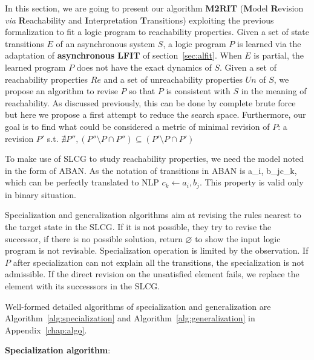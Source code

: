     In this section, we are going to present our algorithm \textbf{M2RIT} (\textbf{M}odel \textbf{R}evision \textit{via} \textbf{R}eachability and \textbf{I}nterpretation \textbf{T}ransitions) exploiting the previous formalization to fit a logic program to reachability properties.
    Given a set of state transitions $E$ of an asynchronous system $S$, a logic program $P$ is learned via the adaptation of \textbf{asynchronous LFIT} of section~\ref{sec:alfit}.
    When $E$ is partial, the learned program $P$ does not have the exact dynamics of $S$.
    Given a set of reachability properties $Re$ and a set of unreachability properties $Un$ of $S$, we propose an algorithm to revise $P$ so that $P$ is consistent with $S$ in the meaning of reachability.
    As discussed previously, this can be done by complete brute force but here we propose a first attempt to reduce the search space.
    Furthermore, our goal is to find what could be considered a metric of minimal revision of $P$:
    a revision $P'$ s.t. $\nexists P'', (P''\setminus P \cap P'')\subseteq (P' \setminus P \cap P')$
    
    To make use of SLCG to study reachability properties, we need the model noted in the form of ABAN.
    As the notation of transitions in ABAN is \ac{a_i, b_j}{}{c_k}, which can be perfectly translated to NLP $c_k \gets a_i, b_j$.
    This property is valid only in binary situation.
    
    Specialization and generalization algorithms aim at revising the rules nearest to the target state in the SLCG. 
    If it is not possible, they try to revise the successor, if there is no possible solution, return $\varnothing$ to show the input logic program is not revisable.
    Specialization operation is limited by the observation. If $P$ after specialization can not explain all the transitions, the specialization is not admissible.
    If the direct revision on the unsatisfied element fails, we replace the element with its successsors in the SLCG.
    
    Well-formed detailed algorithms of specialization and generalization are Algorithm~\ref{alg:specialization} and Algorithm~\ref{alg:generalization} in Appendix~\ref{chap:algo}.

    
    \textbf{Specialization algorithm}:
    
